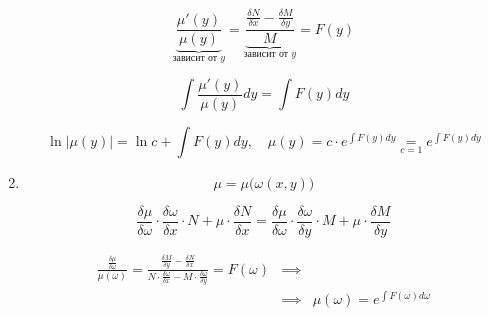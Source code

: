 \begin{note}
\begin{enumerate}
              \[
                  \underbrace{\frac{\mu'(y)}{\mu(y)}}_{\text{зависит от }y} = \underbrace{\frac{\frac{\delta N}{\delta x} - \frac{\delta M}{\delta y}}{M}}_{\text{зависит от }y} = F(y)
              \]

              \[
                  \int\frac{\mu'(y)}{\mu(y)}dy = \int F(y)dy
              \]

              \[
                  \ln|\mu(y)| = \ln c + \int F(y)dy, \quad \mu(y) = c\cdot e^{\int F(y)dy} \underset{c = 1}{=} e^{\int F(y)dy}
              \]

        \item \[
                  \mu = \mu\big(\omega(x,y)\big)
              \]

              \[
                  \frac{\delta \mu}{\delta \omega} \cdot \frac{\delta \omega}{\delta x} \cdot N + \mu \cdot \frac{\delta N}{\delta x} = \frac{\delta \mu}{\delta \omega} \cdot \frac{\delta \omega}{\delta y} \cdot M + \mu \cdot \frac{\delta M}{\delta y}
              \]

              \begin{eqnarray*}
                  \frac{\frac{\delta \mu}{\delta \omega}}{\mu(\omega)} = \frac{\frac{\delta M}{\delta y} - \frac{\delta N}{\delta x}}{N\cdot \frac{\delta \omega}{\delta x} - M\cdot \frac{\delta \omega}{\delta y}} = F(\omega) & \implies & \\
                  & \implies & \mu(\omega) = e^{\int F(\omega)d\omega}
              \end{eqnarray*}
    \end{enumerate}
\end{note}

